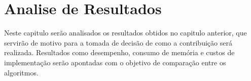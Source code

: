 
\chapter{Analise de Resultados} %
\label{cha:analise_de_resultados}

Neste capitulo serão analisados os resultados obtidos no capitulo anterior, que servirão de motivo para a tomada de decisão de como a contribuição será realizada. Resultados como desempenho, consumo de memória e custos de implementação serão apontadas com o objetivo de comparação entre os algoritmos.






